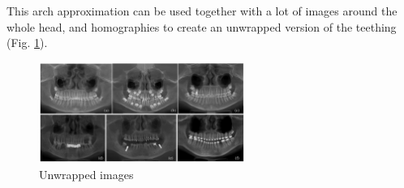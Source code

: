 This arch approximation can be used together with a lot of images around the whole head, and homographies to create an unwrapped version of the teething (Fig. \ref{fig:dental_pano}).

\begin{figure}[H]
    \centering
    \includegraphics[width=0.6\textwidth]{img/dental_pano.png}
    \caption{Unwrapped images}
    \label{fig:dental_pano}
\end{figure}
